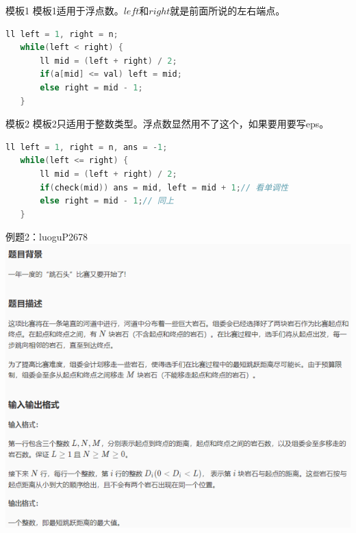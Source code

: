 \documentclass{beamer}[UTF-8]
\begin{document}
\begin{frame}[fragile]{模板1}
    \pause
   模板1适用于浮点数。$left$和$right$就是前面所说的左右端点。 \pause
   \begin{lstlisting}[language = C++,
   numberstyle=\tiny,keywordstyle=\color{blue!70},
   commentstyle=\color{red!50!green!50!blue!50},frame=shadowbox,
   rulesepcolor=\color{red!20!green!20!blue!20},basicstyle=\ttfamily]
   ll left = 1, right = n;
   while(left < right) {
       ll mid = (left + right) / 2;
       if(a[mid] <= val) left = mid;
       else right = mid - 1;
   }
   \end{lstlisting}
   \end{frame}
   
   \begin{frame}[fragile]{模板2}
    \pause
   模板2只适用于整数类型。浮点数显然用不了这个，如果要用要写eps。 \pause
   \begin{lstlisting}[language = C++,
   numberstyle=\tiny,keywordstyle=\color{blue!70},
   commentstyle=\color{red!50!green!50!blue!50},frame=shadowbox,
   rulesepcolor=\color{red!20!green!20!blue!20},basicstyle=\ttfamily]
   ll left = 1, right = n, ans = -1;
   while(left <= right) {
       ll mid = (left + right) / 2;
       if(check(mid)) ans = mid, left = mid + 1;// 看单调性
       else right = mid - 1;// 同上
   }
   \end{lstlisting}
   \end{frame}

\begin{frame}{例题2：luoguP2678}
\includegraphics[width=\textwidth, height=\textheight]{luoguP2678.png}
\end{frame}
\end{document}
